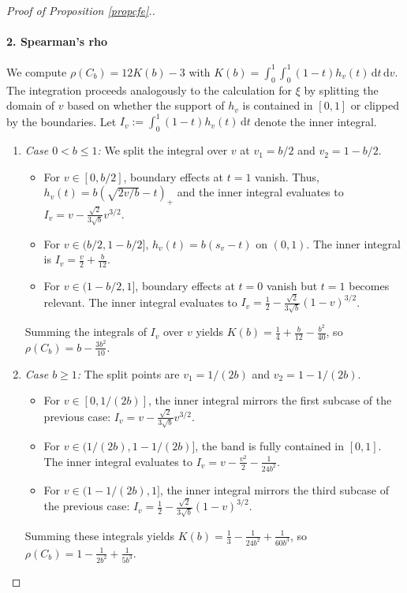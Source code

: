 \documentclass{article}
\theoremstyle{plain}
\theoremstyle{definition}
\newcommand{\de}{\mathrm{\,d}}
\begin{document}
\begin{proof}[Proof of Proposition \ref{propcfe}.]
\paragraph{2. Spearman's rho}
We compute \(\rho(C_b) = 12 K(b) - 3\) with \(K(b) = \int_0^1 \int_0^1 (1-t)h_v(t) \de t \de v\).
The integration proceeds analogously to the calculation for \(\xi\) by splitting the domain of \(v\) based on whether the support of \(h_v\) is contained in \([0,1]\) or clipped by the boundaries. Let \(I_v := \int_0^1 (1-t)h_v(t) \de t\) denote the inner integral.

\begin{enumerate}[label=(\roman*), font=\upshape]
    \item \emph{Case \(0 < b \le 1\):} We split the integral over \(v\) at \(v_1 = b/2\) and \(v_2 = 1 - b/2\).
    \begin{itemize}
        \item For \(v \in [0, b/2]\), boundary effects at \(t=1\) vanish. Thus,
        \(h_v(t) = b(\sqrt{2v/b}-t)_+\) and the inner integral evaluates to \(I_v = v - \frac{\sqrt{2}}{3\sqrt{b}}v^{3/2}\).
        \item For \(v \in (b/2, 1-b/2]\), \(h_v(t) = b(s_v-t)\) on \((0,1)\). The inner integral is \(I_v = \frac{v}{2} + \frac{b}{12}\).
        \item For \(v \in (1-b/2, 1]\), boundary effects at \(t=0\) vanish but \(t=1\) becomes relevant. The inner integral evaluates to \(I_v = \frac{1}{2} - \frac{\sqrt{2}}{3\sqrt{b}}(1-v)^{3/2}\).
    \end{itemize}
    Summing the integrals of \(I_v\) over \(v\) yields \(K(b) = \frac{1}{4} + \frac{b}{12} - \frac{b^2}{40}\), so \(\rho(C_b) = b - \frac{3b^2}{10}\).

    \item \emph{Case \(b \ge 1\):} The split points are \(v_1 = 1/(2b)\) and \(v_2 = 1 - 1/(2b)\).
    \begin{itemize}
        \item For \(v \in [0, 1/(2b)]\), the inner integral mirrors the first subcase of the previous case:
        \(I_v = v - \frac{\sqrt{2}}{3\sqrt{b}}v^{3/2}\).
        \item For \(v \in (1/(2b), 1-1/(2b)]\), the band is fully contained in \([0,1]\). The inner integral evaluates to \(I_v = v - \frac{v^2}{2} - \frac{1}{24b^2}\).
        \item For \(v \in (1-1/(2b), 1]\), the inner integral mirrors the third subcase of the previous case:
        \(I_v = \frac{1}{2} - \frac{\sqrt{2}}{3\sqrt{b}}(1-v)^{3/2}\).
    \end{itemize}
    Summing these integrals yields \(K(b) = \frac{1}{3} - \frac{1}{24b^2} + \frac{1}{60b^3}\), so \(\rho(C_b) = 1 - \frac{1}{2b^2} + \frac{1}{5b^3}\).
\end{enumerate}


\end{proof}
\end{document}
